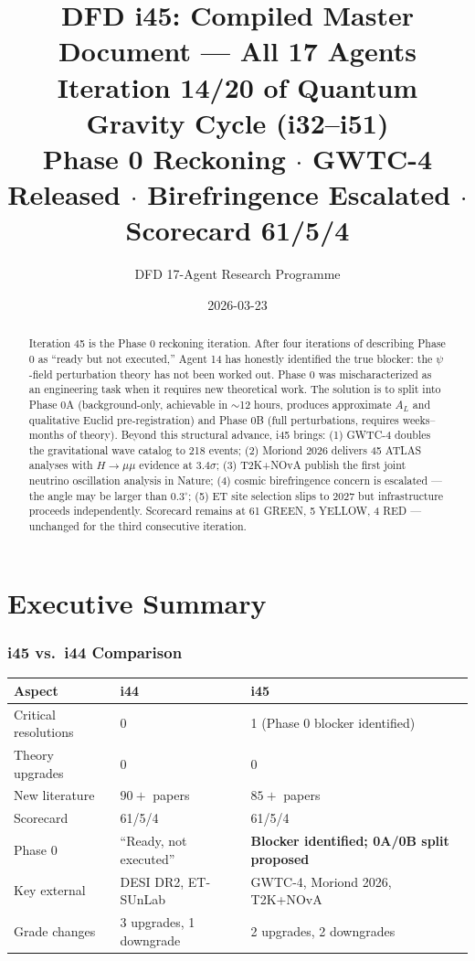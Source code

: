\documentclass[11pt,a4paper]{article}
\title{DFD i45: Compiled Master Document --- All 17 Agents\\[6pt]
\large Iteration 14/20 of Quantum Gravity Cycle (i32--i51)\\[6pt]
\normalsize Phase 0 Reckoning $\cdot$ GWTC-4 Released $\cdot$ Birefringence Escalated $\cdot$ Scorecard 61/5/4}
\author{DFD 17-Agent Research Programme}
\date{2026-03-23}
\begin{document}
\maketitle

\begin{abstract}
Iteration 45 is the Phase 0 reckoning iteration. After four iterations of describing Phase 0 as ``ready but not executed,'' Agent 14 has honestly identified the true blocker: the $\psi$-field perturbation theory has not been worked out. Phase 0 was mischaracterized as an engineering task when it requires new theoretical work. The solution is to split into Phase 0A (background-only, achievable in $\sim$12 hours, produces approximate $A_L$ and qualitative Euclid pre-registration) and Phase 0B (full perturbations, requires weeks--months of theory). Beyond this structural advance, i45 brings: (1) GWTC-4 doubles the gravitational wave catalog to 218 events; (2) Moriond 2026 delivers 45 ATLAS analyses with $H \to \mu\mu$ evidence at $3.4\sigma$; (3) T2K+NOvA publish the first joint neutrino oscillation analysis in Nature; (4) cosmic birefringence concern is escalated --- the angle may be larger than $0.3^\circ$; (5) ET site selection slips to 2027 but infrastructure proceeds independently. Scorecard remains at 61 GREEN, 5 YELLOW, 4 RED --- unchanged for the third consecutive iteration.
\end{abstract}

\tableofcontents
\newpage

\part{Executive Summary}

\section{i45 vs.\ i44 Comparison}

\begin{center}
\begin{tabular}{lll}
\toprule
\textbf{Aspect} & \textbf{i44} & \textbf{i45} \\
\midrule
Critical resolutions & 0 & 1 (Phase 0 blocker identified) \\
Theory upgrades & 0 & 0 \\
New literature & $90+$ papers & $85+$ papers \\
Scorecard & 61/5/4 & 61/5/4 \\
Phase 0 & ``Ready, not executed'' & \textbf{Blocker identified; 0A/0B split proposed} \\
Key external & DESI DR2, ET-SUnLab & GWTC-4, Moriond 2026, T2K+NOvA \\
Grade changes & 3 upgrades, 1 downgrade & 2 upgrades, 2 downgrades \\
\bottomrule
\end{tabular}
\end{center}
\end{document}
